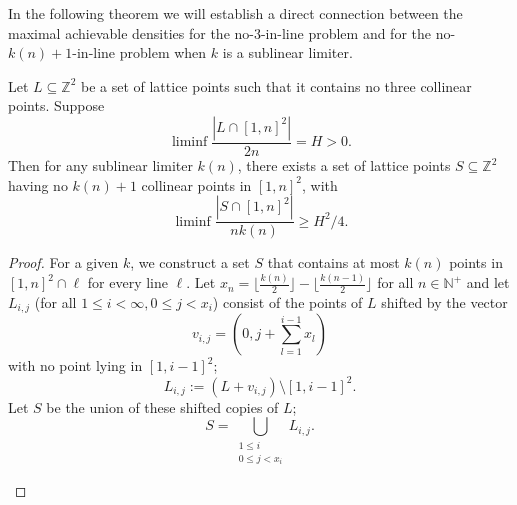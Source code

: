 \documentclass[11pt,a4paper]{article}
\numberwithin{equation}{section}
\newcommand{\nn}{\mathbb{N}}
\newcommand{\zz}{\mathbb{Z}}
\begin{document}
In the following theorem we will establish a direct connection between the maximal achievable densities for the no-3-in-line problem and for the no-$k(n)+1$-in-line problem when $k$ is a sublinear limiter.

\begin{theorem} \label{thm:ulb}
Let $L\subseteq \zz^2$ be a set of lattice points such that it contains no three collinear points. Suppose $$\liminf \frac{| L \cap [1,n]^2|}{2n} = H>0.$$ Then for any sublinear limiter $k(n)$, there exists a set of lattice points $S\subseteq \zz^2$ having no $k(n)+1$ collinear points in $[1,n]^2$, with $$\liminf \frac{|S\cap [1,n]^2|}{nk(n)} \geq H^2/4.$$
\end{theorem}
\begin{proof}
For a given $k$, we construct a set $S$ that contains at most $ k(n)$ points in $[1,n]^2\cap \ell$ for every line $\ell$. 
Let $x_n = \lfloor \frac{k(n)}{2} \rfloor - \lfloor \frac{k(n-1)}{2} \rfloor$ for all $n\in \nn^+$ and let $L_{i,j}$ (for all $1\le i < \infty, 0\le j < x_i$) consist of the points of $L$ shifted by the vector $$v_{i, j}=(0, j+ \sum_{l = 1}^{i - 1}x_l)$$ with no point lying in $[1, i-1]^2$;
$$L_{i, j}:= (L + v_{i, j})\setminus[1, i-1]^2.$$
Let $S$ be the union of these shifted copies of $L$; 
$$S=\bigcup_{\substack{1 \le i  \\ 0 \le j < x_i}} L_{i,j}.$$  



\begin{figure}[h!!]
\centering
{}
\end{figure}
\end{proof}
\end{document}
